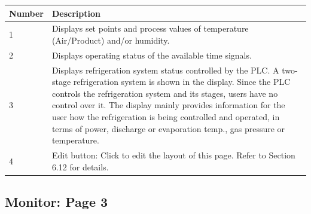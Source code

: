 \begin{longtable}[]{@{}ll@{}}
\toprule
\begin{minipage}[b]{0.38\columnwidth}\raggedright
Number\strut
\end{minipage} & \begin{minipage}[b]{0.56\columnwidth}\raggedright
Description\strut
\end{minipage}\tabularnewline
\midrule
\endhead
\begin{minipage}[t]{0.38\columnwidth}\raggedright
1\strut
\end{minipage} & \begin{minipage}[t]{0.56\columnwidth}\raggedright
Displays set points and process values of temperature (Air/Product)
and/or humidity.\strut
\end{minipage}\tabularnewline
\begin{minipage}[t]{0.38\columnwidth}\raggedright
2\strut
\end{minipage} & \begin{minipage}[t]{0.56\columnwidth}\raggedright
Displays operating status of the available time signals.\strut
\end{minipage}\tabularnewline
\begin{minipage}[t]{0.38\columnwidth}\raggedright
3\strut
\end{minipage} & \begin{minipage}[t]{0.56\columnwidth}\raggedright
Displays refrigeration system status controlled by the PLC. A two-stage
refrigeration system is shown in the display. Since the PLC controls the
refrigeration system and its stages, users have no control over it. The
display mainly provides information for the user how the refrigeration
is being controlled and operated, in terms of power, discharge or
evaporation temp., gas pressure or temperature.\strut
\end{minipage}\tabularnewline
\begin{minipage}[t]{0.38\columnwidth}\raggedright
4\strut
\end{minipage} & \begin{minipage}[t]{0.56\columnwidth}\raggedright
Edit button: Click to edit the layout of this page. Refer to Section
6.12 for details.\strut
\end{minipage}\tabularnewline
\bottomrule
\end{longtable}


\subsection{Monitor: Page 3}

